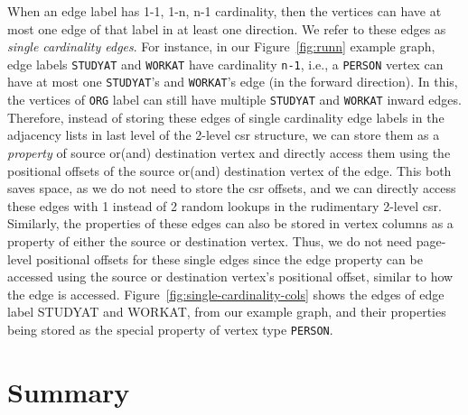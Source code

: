 When an edge label has 1-1, 1-n, n-1 cardinality, then the vertices can have at most one edge of that label in at least one direction. We refer to these edges as {\em single cardinality edges}. For instance, in our Figure~\ref{fig:runn} example graph, edge labels \texttt{STUDYAT} and \texttt{WORKAT} have cardinality \texttt{n-1}, i.e., a \texttt{PERSON} vertex can have at most one \texttt{STUDYAT}'s and \texttt{WORKAT}'s edge (in the forward direction). In this, the vertices of \texttt{ORG} label can still have multiple \texttt{STUDYAT} and \texttt{WORKAT} inward edges. Therefore, instead of storing these edges of single cardinality edge labels in the adjacency lists in last level of the 2-level \gls{csr} structure, we can store them as a \emph{property} of source or(and) destination vertex and directly access them using the positional offsets of the source or(and) destination vertex of the edge. This both saves space, as we do not need to store the \gls{csr} offsets, and we can directly access these edges with 1 instead of 2 random lookups in the rudimentary 2-level \gls{csr}. Similarly, the properties of these edges can also be stored in vertex columns as a property of either the source or destination vertex. Thus, we do not need page-level positional offsets for these single edges since the edge property can be accessed using the source or destination vertex's positional offset, similar to how the edge is accessed. Figure~\ref{fig:single-cardinality-cols} shows the edges of edge label STUDYAT and WORKAT, from our example graph, and their properties being stored as the special property of vertex type \texttt{PERSON}.



\section{Summary}
\label{summary}

